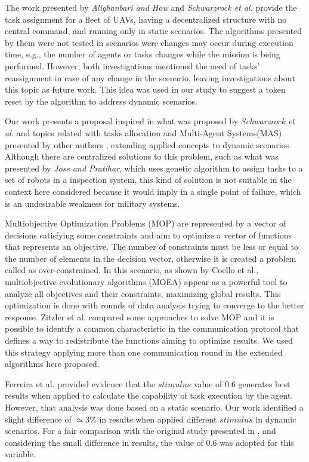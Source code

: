 The work presented by \textit{Alighanbari and How}\cite{alighanbari2005decentralized} and \textit{Schwarzrock et al.}\cite{MAS07} provide the task assignment for a fleet of UAVs, having a decentralized structure with no central command, and running only in static scenarios. The algorithms presented by them were not tested in scenarios were changes may occur during  execution time, e.g., the number of agents or tasks changes while the mission is being performed. However, both investigations mentioned the need of tasks' reassignment in case of any  change in the scenario, leaving investigations about this topic as future work. This idea was used in our study to suggest a token reset by the algorithm to address dynamic scenarios.

Our work presents a proposal inspired in what was proposed by \textit{Schwarzrock et al.}\cite{MAS07} and topics related with tasks allocation and Multi-Agent Systems(MAS) presented by other authors \cite{MAS01, MAS02, MAS03, MAS04, MAS05, MAS06}, extending applied concepts to dynamic scenarios. Although there are centralized solutions to this problem, such as what was presented by \textit{Jose and Pratihar}\cite{jose2016task}, which uses genetic algorithm to assign tasks to a set of robots in a inspection system, this kind of solution is not suitable in the context here considered because it would imply in a single point of failure, which is an undesirable weakness for military systems.

Multiobjective Optimization Problems (MOP) are represented by a vector of decisions satisfying some constraints and aim to optimize a vector of functions that represents an objective. The number of constraints must be less or equal to the number of elements in the decision vector, otherwise it is created a problem called as over-constrained. In this scenario, as shown by Coello et al.\cite{MOEA01},  multiobjective evolutionary algorithms (MOEA) appear as a powerful tool to analyze all objectives and their constraints, maximizing global results. This optimization is done with rounds of data analysis trying to converge to the better response. Zitzler et al.\cite{07} compared some approaches to solve MOP and it is possible to identify a common characteristic in the communication protocol that defines a way to redistribute the functions aiming to optimize results. We used this strategy applying more than one communication round in the extended algorithms here proposed.

Ferreira et al. \cite{ferreira2007swarm} provided evidence that the $stimulus$ value of $0.6$ generates best results when applied to calculate the capability of task execution by the agent. However, that analysis was done based on a static scenario. Our work identified a slight difference of $\simeq 3\%$ in results when applied different $stimulus$ in dynamic scenarios. For a fair comparison with the original study presented in \cite{MAS07}, and considering the small difference in results, the value of $0.6$ was adopted for this variable.

